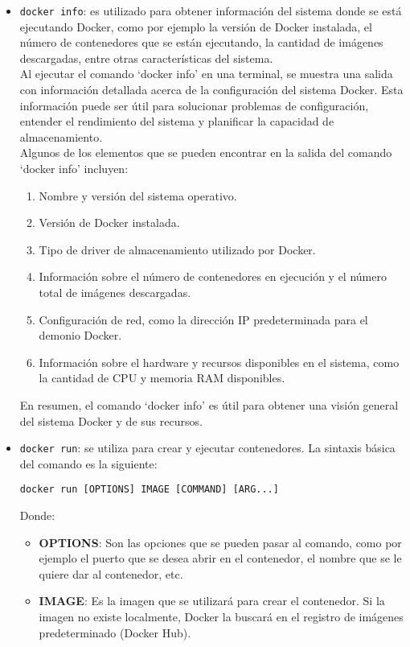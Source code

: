\documentclass{article}
\begin{document}
\begin{itemize}
\item \lstinline{docker info}: es utilizado para obtener información del sistema donde se está ejecutando Docker, como por ejemplo la versión de Docker instalada, el número de contenedores que se están ejecutando, la cantidad de imágenes descargadas, entre otras características del sistema.\\
Al ejecutar el comando \enquote*{docker info} en una terminal, se muestra una salida con información detallada acerca de la configuración del sistema Docker. Esta información puede ser útil para solucionar problemas de configuración, entender el rendimiento del sistema y planificar la capacidad de almacenamiento.\\
Algunos de los elementos que se pueden encontrar en la salida del comando \enquote*{docker info} incluyen:
\begin{enumerate}
      \item Nombre y versión del sistema operativo.
      \item Versión de Docker instalada.
      \item Tipo de driver de almacenamiento utilizado por Docker.
      \item Información sobre el número de contenedores en ejecución y el número total de imágenes descargadas.
      \item Configuración de red, como la dirección IP predeterminada para el demonio Docker.
      \item Información sobre el hardware y recursos disponibles en el sistema, como la cantidad de CPU y memoria RAM disponibles.
\end{enumerate}
En resumen, el comando \enquote*{docker info} es útil para obtener una visión general del sistema Docker y de sus recursos.

\item \lstinline{docker run}: se utiliza para crear y ejecutar contenedores. La sintaxis básica del comando es la siguiente:
    \begin{lstlisting}[numbers=none]
      docker run [OPTIONS] IMAGE [COMMAND] [ARG...]\end{lstlisting}
      Donde:
      \begin{itemize}
      \item \textbf{OPTIONS}: Son las opciones que se pueden pasar al comando, como por ejemplo el puerto que se desea abrir en el contenedor, el nombre que se le quiere dar al contenedor, etc.
      \item \textbf{IMAGE}: Es la imagen que se utilizará para crear el contenedor. Si la imagen no existe localmente, Docker la buscará en el registro de imágenes predeterminado (Docker Hub).


\end{itemize}
\end{itemize}
\end{document}
